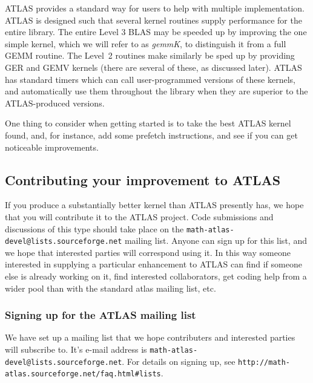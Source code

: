 \documentclass[11pt]{article}
\newcommand{\Wskip}[1]{ }
\begin{document}
ATLAS provides a standard way for users to help with multiple
implementation.  ATLAS is designed such that several kernel routines
supply performance for the entire library.  The entire Level 3 BLAS
may be speeded up by improving the one simple kernel, which we will
refer to as {\it gemmK}, to distinguish it from a full GEMM routine.
The Level~2 routines make similarly be sped up by providing GER and
GEMV kernels (there are several of these, as discussed later).
ATLAS has standard
timers which can call user-programmed versions of these kernels, and
automatically use them throughout the library when they are superior
to the ATLAS-produced versions.

One thing to consider when getting started is to take the best ATLAS kernel
found, and, for instance, add some prefetch instructions, and see if you
can get noticeable improvements.

\subsection{Contributing your improvement to ATLAS}

If you produce a substantially better kernel than ATLAS presently has, we hope
that you will contribute it to the ATLAS project.  Code submissions and 
discussions of this type should take place on the 
{\tt math-atlas-devel@lists.sourceforge.net}
mailing list.  Anyone can sign up for this list, and we hope that interested
parties will correspond using it.  In this way someone interested in supplying
a particular enhancement to ATLAS can find if someone else is already working
on it, find interested collaborators, get coding help from a wider pool than
with the standard atlas mailing list, etc.

\subsubsection{Signing up for the ATLAS mailing list}
We have set up a mailing list that we hope contributers and interested
parties will subscribe to.  It's e-mail address is 
{\tt math-atlas-devel@lists.sourceforge.net}.  For details on signing up, see
{\verb+http://math-atlas.sourceforge.net/faq.html#lists+}.
\Wskip
{
We have set up a mailing list that we hope contributers and interested
parties will subscribe to, {\tt atlas-comm@cs.utk.edu}.  The regular
ATLAS mailing list, {\tt atlas@cs.utk.edu}, is a fixed mailing list, 
whose recipients are limited to the UTK contingent of the ATLAS project.
On the other hand, {\tt atlas-comm@cs.utk.edu}, is a dynamic list, that
users can subscribe and unsubscribe to at will.

To subscribe to this mailing list, send mail to {\tt majordomo@cs.utk.edu},
and include the line {\tt subscribe atlas-comm} as the only body to the 
message.  Unsubscribing is accomplished by sending {\tt unsubscribe atlas-comm}
instead.
}
\end{document}
